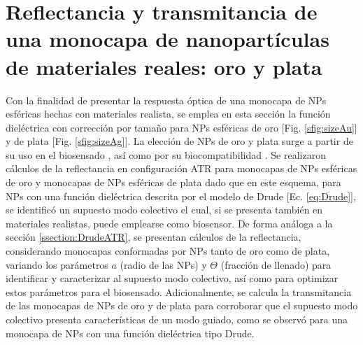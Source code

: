 \section{Reflectancia y transmitancia de una monocapa de nanopartículas de materiales reales: oro y plata}
\label{section:AuAg}

Con la finalidad de presentar la respuesta óptica de una monocapa de NPs esféricas hechas con materiales realista, se emplea en esta sección la función dieléctrica con corrección por tamaño para NPs esféricas de oro [Fig. \ref{sfig:sizeAu}] y de plata [Fig. \ref{sfig:sizeAg}]. La elección de NPs de oro y plata surge a partir de su uso en el biosensado \cite{jain2008noble,estevez2014trends}, así como por su biocompatibilidad \cite{fan2009bio,bosetti2002silver}. Se realizaron cálculos de la reflectancia en configuración ATR para monocapas de NPs esféricas de oro y monocapas de NPs esféricas de plata dado que en este esquema, para NPs con una función dieléctrica descrita por el modelo de Drude [Ec. \eqref{eq:Drude}], se identificó un supuesto modo colectivo el cual, si se presenta también en materiales realistas, puede emplearse como biosensor. De forma análoga a la sección \ref{ssection:DrudeATR}, se presentan cálculos de la reflectancia, considerando monocapas conformadas por NPs tanto de oro como de plata, variando los parámetros $a$ (radio de las NPs) y $\Theta$ (fracción de llenado) para identificar y caracterizar al supuesto modo colectivo, así como para optimizar estos parámetros para el biosensado. Adicionalmente, se calcula la transmitancia de las monocapas de NPs de oro y de plata para corroborar que el supuesto modo colectivo presenta características de un modo guiado, como se observó para una monocapa de NPs con una función dieléctrica tipo Drude.

